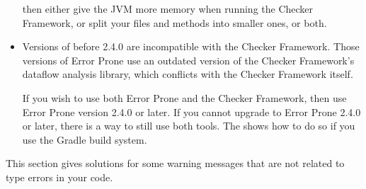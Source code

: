 \begin{itemize}
\noindent
then either give the JVM more memory when running the Checker Framework, or
split your files and methods into smaller ones, or both.

\item
Versions of  before 2.4.0 are
incompatible with the Checker Framework.  Those versions of Error Prone
use an outdated version of the Checker Framework's dataflow analysis
library, which conflicts with the Checker Framework itself.

If you wish to use both Error Prone and the Checker Framework, then use
Error Prone version 2.4.0 or later.
If you cannot upgrade to Error Prone 2.4.0 or later, there is a way to
still use both tools.  The
 shows how to do so if you use the Gradle build
system.

\end{itemize}



This section gives solutions for some warning messages that are not related
to type errors in your code.

